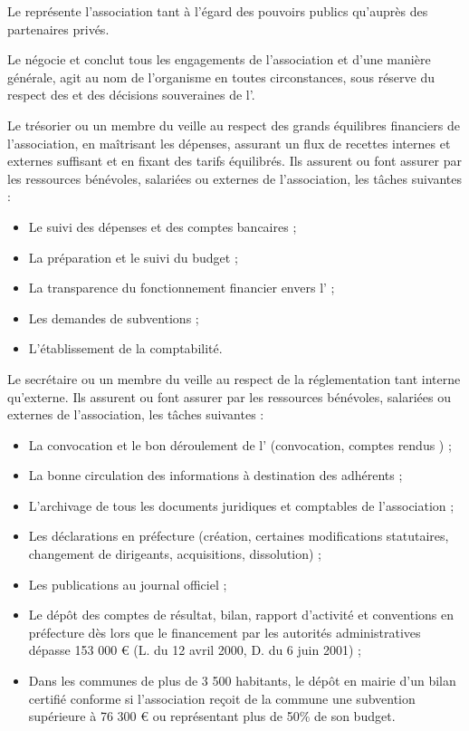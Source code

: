\documentclass[a4paper,french,10pt]{article}
\begin{document}
Le \bureau{} représente l’association tant à l’égard des pouvoirs publics qu’auprès des partenaires privés.

Le \bureau{} négocie et conclut tous les engagements de l’association et d’une manière générale, agit au nom de l’organisme en toutes circonstances, sous réserve du respect des \statuts{} et des décisions souveraines de l’\AG{}.

Le trésorier ou un membre du \bureau{} veille au respect des grands équilibres financiers de l’association, en maîtrisant les dépenses, assurant un flux de recettes internes et externes suffisant et en fixant des tarifs équilibrés. Ils assurent ou font assurer par les ressources bénévoles, salariées ou externes de l’association, les tâches suivantes :
\begin{itemize}
\item Le suivi des dépenses et des comptes bancaires ;
\item La préparation et le suivi du budget ;
\item La transparence du fonctionnement financier envers l’\AG{} ;
\item Les demandes de subventions ;
\item L’établissement de la comptabilité.
\end{itemize}

Le secrétaire ou un membre du \bureau{} veille au respect de la réglementation tant interne qu’externe. Ils assurent ou font assurer par les ressources bénévoles, salariées ou externes de l’association, les tâches suivantes :
\begin{itemize}
\item La convocation et le bon déroulement de l’\AG{} (convocation, comptes rendus ) ;
\item La bonne circulation des informations à destination des adhérents ;
\item L’archivage de tous les documents juridiques et comptables de l’association ;
\item Les déclarations en préfecture (création, certaines modifications statutaires, changement de dirigeants, acquisitions, dissolution) ;
\item Les publications au journal officiel ;
\item Le dépôt des comptes de résultat, bilan, rapport d’activité et conventions en préfecture dès lors que le financement par les autorités administratives dépasse 153 000 \euro{} (L. du 12 avril 2000, D. du 6 juin 2001) ;
\item Dans les communes de plus de 3 500 habitants, le dépôt en mairie d’un bilan certifié conforme si l’association reçoit de la commune une subvention supérieure à 76 300 \euro{} ou représentant plus de 50\% de son budget.
\end{itemize}
\end{document}
